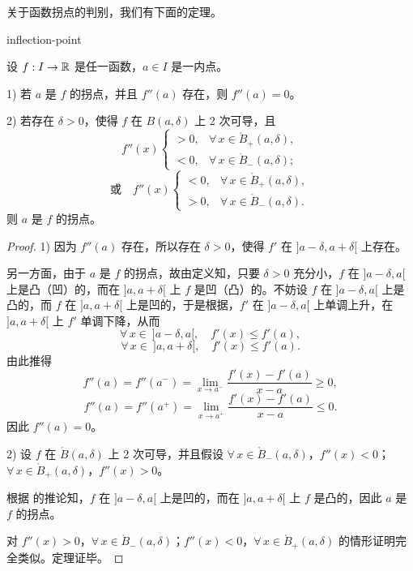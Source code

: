 关于函数拐点的判别，我们有下面的定理。

\begin{mythm}{}{inflection-point}

	设 \(f:I\to\mathbb{R}\) 是任一函数，\(a\in I\) 是一内点。

	1) 若 \(a\) 是 \(f\) 的拐点，并且 \(f''(a)\) 存在，则 \(f''(a)=0\)。

	2) 若存在 \(\delta>0\)，使得 \(f\) 在 \(B(a,\delta)\) 上 2 次可导，且
	\[
	f''(x)\begin{cases} >0, & \forall\,x\in\mathring B_+(a,\delta), \\ <0, & \forall\,x\in\mathring B_-(a,\delta); \end{cases}
	\]
	\[
	\text{或}\quad f''(x)\begin{cases} <0, & \forall\,x\in\mathring B_+(a,\delta), \\ >0, & \forall\,x\in\mathring B_-(a,\delta). \end{cases}
	\]
	则 \(a\) 是 \(f\) 的拐点。

\end{mythm}

\begin{proof}

	1) 因为 \(f''(a)\) 存在，所以存在 \(\delta>0\)，使得 \(f'\) 在 \(]a-\delta,a+\delta[\) 上存在。

	另一方面，由于 \(a\) 是 \(f\) 的拐点，故由定义知，只要 \(\delta>0\) 充分小，\(f\) 在 \(]a-\delta,a[\) 上是凸（凹）的，而在 \(]a,a+\delta[\) 上 \(f\) 是凹（凸）的。不妨设 \(f\) 在 \(]a-\delta,a[\) 上是凸的，而 \(f\) 在 \(]a,a+\delta[\) 上是凹的，于是根据，\(f'\) 在 \(]a-\delta,a[\) 上单调上升，在 \(]a,a+\delta[\) 上 \(f'\) 单调下降，从而
	\[
	\forall\,x\in\ ]a-\delta,a[,\quad f'(x)\le f'(a),
	\]
	\[
	\forall\,x\in\ ]a,a+\delta[,\quad f'(x)\le f'(a).
	\]
	由此推得
	\[
	f''(a)=f''(a^-)=\lim_{x\to a^-}\frac{f'(x)-f'(a)}{x-a}\ge0,
	\]
	\[
	f''(a)=f''(a^+)=\lim_{x\to a^+}\frac{f'(x)-f'(a)}{x-a}\le0.
	\]
	因此 \(f''(a)=0\)。

	2) 设 \(f\) 在 \(\mathring B(a,\delta)\) 上 2 次可导，并且假设 \(\forall\,x\in\mathring B_-(a,\delta)\)，\(f''(x)<0\)；\(\forall\,x\in\mathring B_+(a,\delta)\)，\(f''(x)>0\)。

	根据 的推论知，\(f\) 在 \(]a-\delta,a[\) 上是凹的，而在 \(]a,a+\delta[\) 上 \(f\) 是凸的，因此 \(a\) 是 \(f\) 的拐点。

	对 \(f''(x)>0\)，\(\forall\,x\in\mathring B_-(a,\delta)\)；\(f''(x)<0\)，\(\forall\,x\in\mathring B_+(a,\delta)\) 的情形证明完全类似。定理证毕。

\end{proof}

